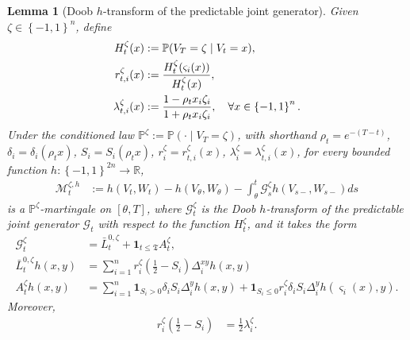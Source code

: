\documentclass[11pt]{article}
\newcommand{\flip}{\varsigma}
\newcommand{\cM}{\mathcal{M}}
\newcommand{\stopT}{{\boldsymbol{\mathfrak{T}}}}
\newcommand{\uV}{V}
\newcommand{\uW}{W}
\newcommand{\cG}{\mathcal{G}}
\newcommand{\jL}{\bar{L}}
\theoremstyle{named}
\theoremstyle{plain}
\newtheorem{lemma}{Lemma}
\newcommand{\defn}{:=}
\newcommand{\real}{\ensuremath{\mathbb{R}}}
\newcommand{\Prob}{\ensuremath{{\mathbb{P}}}}
\newcommand{\parenth}[1]{\left( #1 \right)}
\newcommand{\braces}[1]{\left\{ #1 \right \}}
\begin{document}
\begin{lemma}[Doob $h$-transform of the predictable joint generator]
  \label{lem:Doob_h_transform}
  Given $\zeta \in \braces{-1,1}^n$, define
  \begin{align}
    \label{eq:def_H_r_lambda}
    H_t^\zeta(x) &\defn \Prob(\uV_T = \zeta \mid \uV_t = x), \notag \\
    r_{t, i}^{\zeta}(x) &\defn \frac{H_t^\zeta(\flip_i(x))}{H_t^\zeta(x)}, \notag \\
    \lambda_{t, i}^{\zeta}(x) &\defn \frac{1 - \rho_t x_i \zeta_i}{1 + \rho_t x_i \zeta_i}, \quad \forall x \in \braces{-1, 1}^n.
  \end{align}
  Under the conditioned law $\Prob^\zeta \defn \Prob(\cdot \mid \uV_T = \zeta)$,  with shorthand $\rho_t = e^{-(T-t)}$, $\delta_i = \delta_i(\rho_t x)$, $S_i = S_i(\rho_t x)$, $r_i^{\zeta} = r_{t, i}^{\zeta}(x)$, $\lambda_i^{\zeta} = \lambda_{t, i}^{\zeta}(x)$, for every bounded function $h: \braces{-1, 1}^{2n} \to \real$, 
  \begin{align*}
    \cM_t^{\zeta, h} &\defn h(\uV_t, \uW_t) - h(\uV_\theta, \uW_\theta) - \int_\theta^t \cG_s^\zeta h(\uV_{s-}, \uW_{s-}) ds
  \end{align*}
  is a $\Prob^\zeta$-martingale on $[\theta, T]$, where $\cG_t^\zeta$ is the Doob $h$-transform of the predictable joint generator $\cG_t$ with respect to the function $H_t^\zeta$, and it takes the form
  \begin{align*}
    \cG_t^\zeta &= \jL_t^{0, \zeta} + \mathbf{1}_{t \leq \stopT} A_t^\zeta, \\
    \jL_t^{0, \zeta} h(x, y) &= \sum_{i=1}^n r_{i}^{\zeta} \parenth{\frac12 - S_i } \Delta_i^{xy} h(x, y) \\
    A_t^\zeta h(x, y) &= \sum_{i=1}^n  \mathbf{1}_{S_i > 0}  \delta_i  S_i \Delta_{i}^y h(x, y)  + \mathbf{1}_{S_i \leq 0} r_{i}^{\zeta} \delta_i  S_i  \Delta_i^y h(\flip_i(x), y).
  \end{align*}
  Moreover,
  \begin{align*}
    r_i^{\zeta} \parenth{\frac12 - S_i } &=  \frac12 \lambda_{i}^\zeta.
  \end{align*}
\end{lemma}
\end{document}

